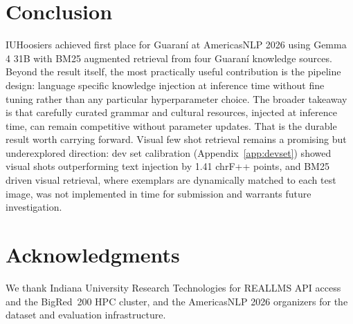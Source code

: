 \documentclass[11pt]{article}
\begin{document}
\section{Conclusion}
IUHoosiers achieved first place for Guaraní at AmericasNLP 2026 using Gemma 4 31B with BM25 augmented retrieval from four Guaraní knowledge sources. Beyond the result itself, the most practically useful contribution is the pipeline design: language specific knowledge injection at inference time without fine tuning rather than any particular hyperparameter choice. The broader takeaway is that carefully curated grammar and cultural resources, injected at inference time, can remain competitive without parameter updates. That is the durable result worth carrying forward. Visual few shot retrieval remains a promising but underexplored direction: dev set calibration (Appendix~\ref{app:devset}) showed visual shots outperforming text injection by 1.41 chrF++ points, and BM25 driven visual retrieval, where exemplars are dynamically matched to each test image, was not implemented in time for submission and warrants future investigation.

\section*{Acknowledgments}

We thank Indiana University Research Technologies for REALLMS API
access and the BigRed~200 HPC cluster, and the AmericasNLP 2026
organizers for the dataset and evaluation infrastructure.



\appendix
\end{document}
